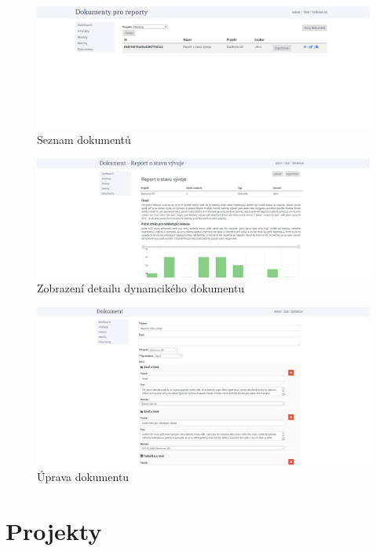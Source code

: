 \documentclass[czech,master]{diploma}
\begin{document}
\begin{figure}[!ht]
    \centering
    \includegraphics[width=1\textwidth]{Diplomka/Figures/metrics_tool/documents.jpg}
    \caption{Seznam dokumentů}
    \label{fig:metrics_tool_documents}
\end{figure}

\begin{figure}[!ht]
    \centering
    \includegraphics[width=1\textwidth]{Diplomka/Figures/metrics_tool/documents_detail.jpg}
    \caption{Zobrazení detailu dynamcikého dokumentu}
    \label{fig:metrics_tool_documents_detail}
\end{figure}


\begin{figure}[!ht]
    \centering
    \includegraphics[width=1\textwidth]{Diplomka/Figures/metrics_tool/documents_edit.jpg}
    \caption{Úprava dokumentu}
    \label{fig:metrics_tool_documents_edit}
\end{figure}
\newpage
\section{Projekty}
\end{document}
